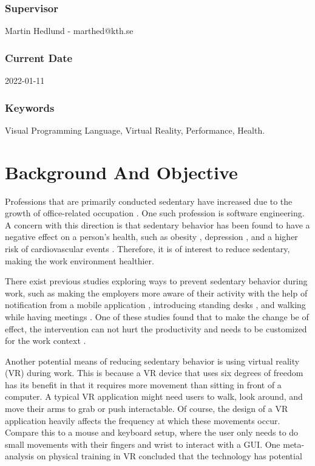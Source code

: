 \documentclass{sigchi}
\begin{document}
\subsubsection{Supervisor} 
Martin Hedlund - marthed@kth.se

\subsubsection{Current Date} 
2022-01-11

\subsubsection{Keywords} 
Visual Programming Language, Virtual Reality, Performance, Health.

\section{Background And Objective}

Professions that are primarily conducted sedentary have increased due to the growth of office-related occupation \cite{parry_contribution_2013}. One such profession is software engineering. A concern with this direction is that sedentary behavior has been found to have a negative effect on a person's health, such as obesity \cite{lakdawalla_labor_2007}, depression \cite{zhai_sedentary_2015}, and a higher risk of cardiovascular events \cite{straker_sedentary_2016}. Therefore, it is of interest to reduce sedentary, making the work environment healthier.

There exist previous studies exploring ways to prevent sedentary behavior during work, such as making the employers more aware of their activity with the help of notification from a mobile application \cite{cole_they_2015}, introducing standing desks \cite{pronk_reducing_2012}, and walking while having meetings \cite{bort-roig_uptake_2014}. One of these studies found that to make the change be of effect, the intervention can not hurt the productivity and needs to be customized for the work context \cite{bort-roig_uptake_2014}.


Another potential means of reducing sedentary behavior is using virtual reality (VR) during work. This is because a VR device that uses six degrees of freedom has its benefit in that it requires more movement than sitting in front of a computer. A typical VR application might need users to walk, look around, and move their arms to grab or push interactable. Of course, the design of a VR application heavily affects the frequency at which these movements occur. Compare this to a mouse and keyboard setup, where the user only needs to do small movements with their fingers and wrist to interact with a GUI. One meta-analysis on physical training in VR concluded that the technology has potential \cite{ng_effectiveness_2019}
\end{document}
